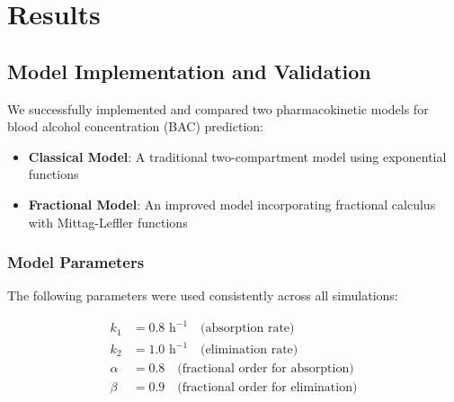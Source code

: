 \documentclass[11pt]{article}
\begin{document}

\section{Results}

\subsection{Model Implementation and Validation}

We successfully implemented and compared two pharmacokinetic models for blood alcohol concentration (BAC) prediction:

\begin{itemize}
    \item \textbf{Classical Model}: A traditional two-compartment model using exponential functions
    \item \textbf{Fractional Model}: An improved model incorporating fractional calculus with Mittag-Leffler functions
\end{itemize}

\subsubsection{Model Parameters}

The following parameters were used consistently across all simulations:

\begin{align}
k_1 &= 0.8 \text{ h}^{-1} \quad \text{(absorption rate)} \\
k_2 &= 1.0 \text{ h}^{-1} \quad \text{(elimination rate)} \\
\alpha &= 0.8 \quad \text{(fractional order for absorption)} \\
\beta &= 0.9 \quad \text{(fractional order for elimination)}
\end{align}
\end{document}
